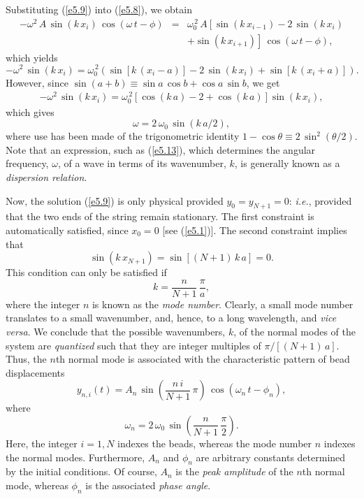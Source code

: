 Substituting (\ref{e5.9}) into (\ref{e5.8}), we obtain
\begin{eqnarray}
-\omega^2\,A\,\sin(k\,x_i)\,\cos(\omega\,t-\phi)
&=&\omega_0^{\,2}\,A\left[\sin(k\,x_{i-1})-2\,\sin(k\,x_i)\right.\nonumber\\[0.5ex]
&&\left.+\sin(k\,x_{i+1})\right]\,\cos(\omega\,t-\phi),
\end{eqnarray}
which yields
\begin{equation}
-\omega^2\,\sin(k\,x_i)=\omega_0^{\,2}\left(\sin[k\,(x_i-a)] -2\,\sin(k\,x_i)
+\sin[k\,(x_i+a)]\right).
\end{equation}
However, since $\sin(a+b)\equiv \sin a\,\cos b + \cos a\,\sin b$, we get
\begin{eqnarray}
-\omega^2\,\sin(k\,x_i)=\omega_0^{\,2}\left[\cos(k\,a)-2+\cos(k\,a)\right]\sin(k\,x_i),
\end{eqnarray}
which gives
\begin{equation}\label{e5.13}
\omega = 2\,\omega_0\,\sin(k\,a/2),
\end{equation}
where use has been made of the trigonometric identity $1-\cos\theta \equiv 2\,\sin^2(\theta/2)$. Note that an expression, such as (\ref{e5.13}), which determines the angular frequency, $\omega$, of
a wave in terms of its wavenumber, $k$, is generally known as a {\em dispersion relation}.

Now, the solution (\ref{e5.9}) is only physical provided $y_0=y_{N+1}=0$: {\em i.e.},
provided that the two ends of the string remain stationary. The first constraint
is automatically satisfied, since $x_0=0$ [see (\ref{e5.1})]. The second constraint
implies that
\begin{equation}
\sin(k\,x_{N+1}) = \sin[(N+1)\,k\,a] = 0.
\end{equation}
This condition can only be  satisfied if
\begin{equation}\label{e5.15}
k = \frac{n}{N+1}\,\frac{\pi}{a},
\end{equation}
where the integer $n$ is  known as the {\em mode number}. Clearly, a small mode number translates to a small wavenumber, and, hence, to a
long wavelength, and {\em vice versa}. We conclude that the possible wavenumbers, $k$, of the normal modes of the system are
{\em quantized}\/ such that they are integer multiples of $\pi/[(N+1)\,a]$. 
Thus, the $n$th normal mode  is
associated with the characteristic pattern of bead displacements
\begin{equation}\label{e5.16}
y_{n,i}(t)=A_n\,\sin\left(\frac{n\,i}{N+1}\,\pi\right)\,\cos(\omega_n\,t-\phi_n),
\end{equation}
where
\begin{equation}\label{e5.17}
\omega_n = 2\,\omega_0\,\sin\left(\frac{n}{N+1}\,\frac{\pi}{2}\right).
\end{equation}
Here, the integer $i=1,N$ indexes the beads, whereas the mode number $n$ indexes the normal modes. Furthermore,
$A_n$ and $\phi_n$ are arbitrary constants determined by the initial conditions. 
Of course, $A_n$ is the {\em peak amplitude}\/ of the $n$th normal mode, whereas $\phi_n$
is the associated {\em phase angle}.

